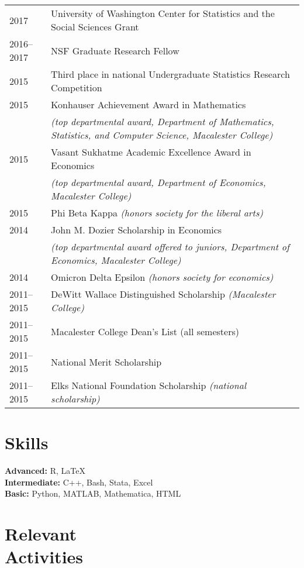 \documentclass[margin,centered]{res}
\begin{document}
\begin{resume}
\begin{tabular}{@{}p{0.8in}p{4in}}
2017 & University of Washington Center for Statistics and the Social Sciences Grant\\
2016--2017 & NSF Graduate Research Fellow\\
2015 & Third place in national Undergraduate Statistics Research Competition\\
2015 & Konhauser Achievement Award in Mathematics \\
&\textit{(top departmental award, Department of Mathematics, Statistics, and Computer Science, Macalester College)}\\
2015 & Vasant Sukhatme Academic Excellence Award in Economics\\& \textit{(top departmental award, Department of Economics, Macalester College)}\\
2015 & Phi Beta Kappa \textit{(honors society for the liberal arts)}\\
2014 & John M. Dozier Scholarship in Economics \\ &\textit{(top departmental award offered to juniors, Department of Economics, Macalester College)}\\
2014 & Omicron Delta Epsilon \textit{(honors society for economics)}\\
2011--2015 & DeWitt Wallace Distinguished Scholarship \textit{(Macalester College)}\\
2011--2015 & Macalester College Dean's List (all semesters)\\
2011--2015 & National Merit Scholarship \\
2011--2015 & Elks National Foundation Scholarship \textit{(national scholarship)}\\
\end{tabular}





\section{\sc Skills}
{\bf Advanced:} R, LaTeX\\
{\bf Intermediate:} C++, Bash, Stata, Excel\\
{\bf Basic:} Python, MATLAB, Mathematica, HTML


\section{\sc Relevant \\ Activities}



\end{resume}
\end{document}

